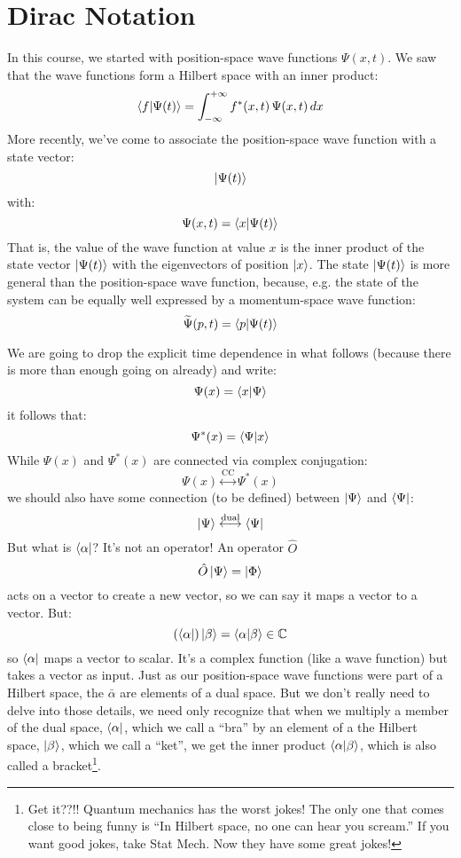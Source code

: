 \documentclass[12pt]{book}
\begin{document}
\section{Dirac Notation}

In this course, we started with position-space wave functions $\Psi(x,t)$.  We saw that the wave functions form a Hilbert space with an inner product:
$$\braket{f|\Psi(t)} = \int_{-\infty}^{+\infty} f^*(x,t) \, \Psi(x,t) \, dx$$
More recently, we've come to associate the position-space wave function with a state vector:
$$\ket{\Psi(t)}$$
with:
$$\Psi(x,t) = \braket{x|\Psi(t)}$$
That is, the value of the wave function at value $x$ is the inner product of the state vector 
$\ket{\Psi(t)}$ with the eigenvectors of position $\ket{x}$.  The state $\ket{\Psi(t)}$ is more general than the position-space wave function, because, e.g. the state of the system can be equally well expressed by a momentum-space wave function:
$$\widetilde{\Psi}(p,t) = \braket{p|\Psi(t)}$$

We are going to drop the explicit time dependence in what follows (because there is more than enough going on already) and write:
$$\Psi(x) = \braket{x|\Psi}$$
it follows that:
$$\Psi^*(x) = \braket{\Psi|x}$$
While $\Psi(x)$ and $\Psi^*(x)$ are connected via complex conjugation:
$$\Psi(x) \overset{\text{CC}}{\longleftrightarrow} \Psi^*(x)$$
we should also have some connection (to be defined) between $\ket{\Psi}$ and $\bra{\Psi}$:
$$\ket{\Psi} \overset{\text{dual}}{\longleftrightarrow} \bra{\Psi}$$
But what is $\bra{\alpha}$?  It's not an operator!  An operator $\hat{O}$
$$\hat{O} \ket{\Psi} = \ket{\Phi}$$
acts on a vector to create a new vector, so we can say it maps a vector to a vector.  But:
$$(\bra{\alpha}) \ket{\beta} = \braket{\alpha|\beta} \in \mathbb{C}$$
so $\bra{\alpha}$ maps a vector to scalar.  It's a complex function (like a wave function) but takes a vector as input.  Just as our position-space wave functions were part of a Hilbert space, the $\bar{\alpha}$ are elements of a dual space.  But we don't really need to delve into those details, we need only recognize that when we multiply a member of the dual space, $\bra{\alpha}$, which we call a ``bra''
by an element of a the Hilbert space, $\ket{\beta}$, which we call a ``ket'', we get the inner product
$\braket{\alpha|\beta}$, which is also called a bracket\footnote{Get it??!!  Quantum mechanics has the worst jokes!  The only one that comes close to being funny is ``In Hilbert space, no one can hear you scream.'' If you want good jokes, take Stat Mech.  Now they have some great jokes!}.
\end{document}
